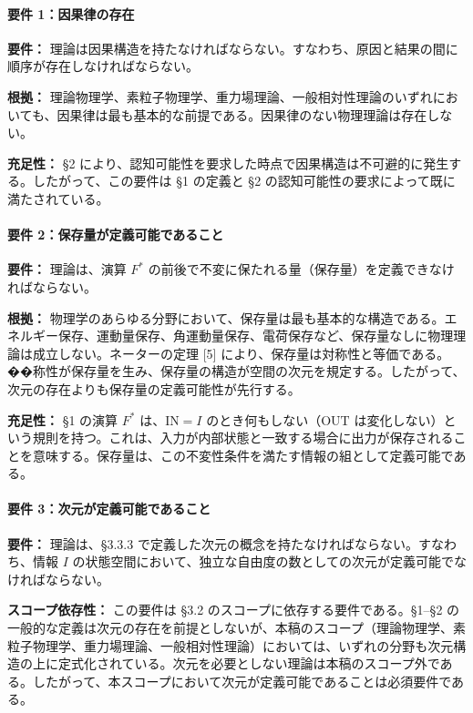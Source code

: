 \documentclass[a4paper,11pt]{ltjsarticle}
\begin{document}
\paragraph{要件
1：因果律の存在}\label{ux8981ux4ef6-1ux56e0ux679cux5f8bux306eux5b58ux5728}

\textbf{要件：}
理論は因果構造を持たなければならない。すなわち、原因と結果の間に順序が存在しなければならない。

\textbf{根拠：}
理論物理学、素粒子物理学、重力場理論、一般相対性理論のいずれにおいても、因果律は最も基本的な前提である。因果律のない物理理論は存在しない。

\textbf{充足性：} §2
により、認知可能性を要求した時点で因果構造は不可避的に発生する。したがって、この要件は
§1 の定義と §2 の認知可能性の要求によって既に満たされている。

\paragraph{要件
2：保存量が定義可能であること}\label{ux8981ux4ef6-2ux4fddux5b58ux91cfux304cux5b9aux7fa9ux53efux80fdux3067ux3042ux308bux3053ux3068}

\textbf{要件：} 理論は、演算 \(F^*\)
の前後で不変に保たれる量（保存量）を定義できなければならない。

\textbf{根拠：}
物理学のあらゆる分野において、保存量は最も基本的な構造である。エネルギー保存、運動量保存、角運動量保存、電荷保存など、保存量なしに物理理論は成立しない。ネーターの定理
{[}5{]}
により、保存量は対称性と等価である。��称性が保存量を生み、保存量の構造が空間の次元を規定する。したがって、次元の存在よりも保存量の定義可能性が先行する。

\textbf{充足性：} §1 の演算 \(F^*\) は、\(\mathrm{IN} = I\)
のとき何もしない（\(\mathrm{OUT}\)
は変化しない）という規則を持つ。これは、入力が内部状態と一致する場合に出力が保存されることを意味する。保存量は、この不変性条件を満たす情報の組として定義可能である。

\paragraph{要件
3：次元が定義可能であること}\label{ux8981ux4ef6-3ux6b21ux5143ux304cux5b9aux7fa9ux53efux80fdux3067ux3042ux308bux3053ux3068}

\textbf{要件：} 理論は、§3.3.3
で定義した次元の概念を持たなければならない。すなわち、情報 \(I\)
の状態空間において、独立な自由度の数としての次元が定義可能でなければならない。

\textbf{スコープ依存性：} この要件は §3.2
のスコープに依存する要件である。§1--§2
の一般的な定義は次元の存在を前提としないが、本稿のスコープ（理論物理学、素粒子物理学、重力場理論、一般相対性理論）においては、いずれの分野も次元構造の上に定式化されている。次元を必要としない理論は本稿のスコープ外である。したがって、本スコープにおいて次元が定義可能であることは必須要件である。
\end{document}
